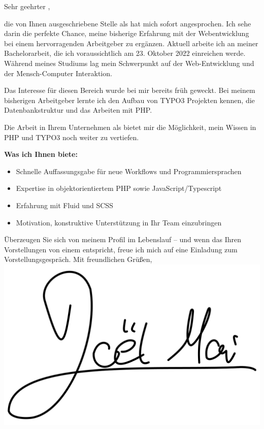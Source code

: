 \begin{minipage}[t]{0.85\textwidth}
Sehr geehrter \contactName,\newline

die von Ihnen ausgeschriebene Stelle als \jobposition hat mich sofort angesprochen. Ich sehe darin die perfekte Chance, meine bisherige Erfahrung mit der Webentwicklung bei einem hervorragenden Arbeitgeber zu ergänzen. Aktuell arbeite ich an meiner Bachelorarbeit, die ich voraussichtlich am 23. Oktober 2022 einreichen werde. Während meines Studiums lag mein Schwerpunkt auf der Web-Entwicklung und der Mensch-Computer Interaktion.\newline

Das Interesse für diesen Bereich wurde bei mir bereits früh geweckt. Bei meinem bisherigen Arbeitgeber lernte ich den Aufbau von TYPO3 Projekten kennen, die Datenbankstruktur und das Arbeiten mit PHP.\newline

Die Arbeit in Ihrem Unternehmen als \jobposition bietet mir die Möglichkeit, mein Wissen in PHP und TYPO3 noch weiter zu vertiefen.\newline

\textbf{Was ich Ihnen biete:}
\begin{itemize}
    \item Schnelle Auffassungsgabe für neue Workflows und Programmiersprachen
    \item Expertise in objektorientiertem PHP sowie JavaScript/Typescript
    \item Erfahrung mit Fluid und SCSS
    \item Motivation, konstruktive Unterstützung in Ihr Team einzubringen
\end{itemize}

Überzeugen Sie sich von meinem Profil im Lebenslauf – und wenn das Ihren Vorstellungen von einem \jobposition entspricht, freue ich mich auf eine Einladung zum Vorstellungsgespräch.\newline
\newline
Mit freundlichen Grüßen,\newline\newline
\vspace{0.8cm}
\includegraphics[scale=0.3]{assets/images/signature.png}
\end{minipage}
